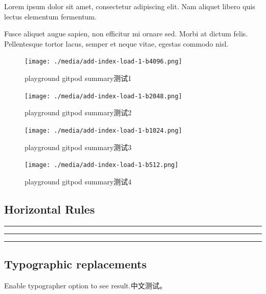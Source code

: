 \documentclass[
  paper=a4,
  ,captions=tableheading
]{scrartcl}
\begin{document}
Lorem ipsum dolor sit amet, consectetur adipiscing elit. Nam aliquet
libero quis lectus elementum fermentum.

Fusce aliquet augue sapien, non efficitur mi ornare sed. Morbi at dictum
felis. Pellentesque tortor lacus, semper et neque vitae, egestas commodo
nisl.

\begin{figure}
\centering
\texttt{[image: ./media/add-index-load-1-b4096.png]}
\caption{playground gitpod summary测试1}
\end{figure}

\begin{figure}
\centering
\texttt{[image: ./media/add-index-load-1-b2048.png]}
\caption{playground gitpod summary测试2}
\end{figure}

\begin{figure}
\centering
\texttt{[image: ./media/add-index-load-1-b1024.png]}
\caption{playground gitpod summary测试3}
\end{figure}

\begin{figure}
\centering
\texttt{[image: ./media/add-index-load-1-b512.png]}
\caption{playground gitpod summary测试4}
\end{figure}

\hypertarget{horizontal-rules}{%
\subsection{Horizontal Rules}\label{horizontal-rules}}

\begin{center}\rule{0.5\linewidth}{0.5pt}\end{center}

\begin{center}\rule{0.5\linewidth}{0.5pt}\end{center}

\begin{center}\rule{0.5\linewidth}{0.5pt}\end{center}

\hypertarget{typographic-replacements}{%
\subsection{Typographic replacements}\label{typographic-replacements}}

Enable typographer option to see result.中文测试。
\end{document}
